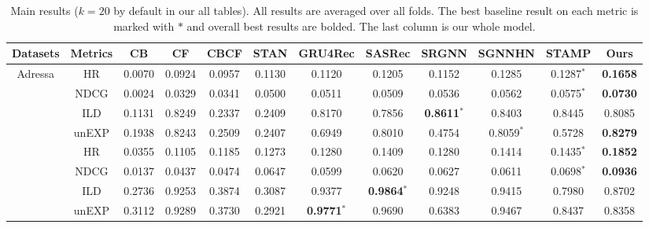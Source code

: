 \begin{table}[th]\setlength{\tabcolsep}{7.5pt}
  \caption{Main results ($k=20$ by default in our all tables). All results are averaged over all folds. The best baseline result on 
  each metric is marked with $*$ and overall best results are bolded. The last column is our whole model.}
    \label{performance-table}
    \centering
    \renewcommand{\arraystretch}{1.3}
    \begin{tabular}{|c|c|ccccccccc|c|}
    \hline
    Datasets&Metrics&CB&CF&CBCF&STAN&GRU4Rec&SASRec&SRGNN&SGNNHN&STAMP&Ours \\ 
    \hline
    \multirow{5}{*}{Adressa} & HR & 0.0070 & 0.0924 & 0.0957 & 0.1130 & 0.1120 & 0.1205 & 0.1152 & 0.1285 & 0.1287$^*$ & \textbf{0.1658} \\ 
    \cline{2-12}
    & NDCG & 0.0024 & 0.0329 & 0.0341 & 0.0500 & 0.0511 & 0.0509 & 0.0536 & 0.0562 & 0.0575$^*$ & \textbf{0.0730} \\ 
    \cline{2-12}
    & ILD & 0.1131 & 0.8249 & 0.2337 & 0.2409 & 0.8170 & 0.7856 & \textbf{0.8611}$^*$ & 0.8403 & 0.8445 & 0.8085\\ 
    \cline{2-12}
    & unEXP & 0.1938 & 0.8243 & 0.2509 & 0.2407 & 0.6949 & 0.8010  & 0.4754
  & 0.8059$^*$ & 0.5728 & \textbf{0.8279} \\ 
    \cline{2-12}
    \hline
    \multirow{5}{*}{Globo} & HR & 0.0355 & 0.1105 & 0.1185 & 0.1273 & 0.1280 & 0.1409 & 0.1280 & 0.1414 & 0.1435$^*$ & \textbf{0.1852}\\ 
    \cline{2-12}
    & NDCG & 0.0137 & 0.0437 & 0.0474 & 0.0647 & 0.0599 & 0.0620 & 0.0627 & 0.0611 & 0.0698$^*$ & \textbf{0.0936}\\ 
    \cline{2-12}
    & ILD & 0.2736 & 0.9253 & 0.3874 & 0.3087 & 0.9377 & \textbf{0.9864}$^*$ & 0.9248 & 0.9415 & 0.7980 & 0.8702\\
    \cline{2-12}
    & unEXP & 0.3112 & 0.9289 & 0.3730 & 0.2921 & \textbf{0.9771}$^*$ &0.9690   & 0.6383  & 0.9467 &  0.8437 & 0.8358 \\ 
    \cline{2-12}

\end{tabular}
\end{table}
